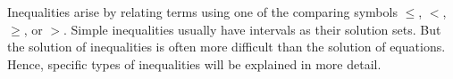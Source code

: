 



%
%

\begin{MSectionStart}

Inequalities arise by relating terms using one of the comparing symbols $\leq$, $<$, $\geq$, or $>$. Simple 
inequalities usually have intervals as their solution sets. But the solution of inequalities is often
more difficult than the solution of equations. Hence, specific types of inequalities will be explained
in more detail.


\MModstartBox
\end{MSectionStart}


